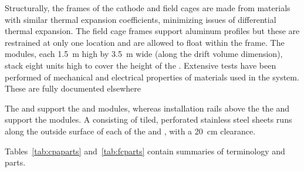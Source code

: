 Structurally, the frames of the cathode and field cages are made from materials with similar thermal expansion coefficients, minimizing issues of differential thermal expansion. The field cage frames support aluminum profiles but these are restrained at only one location and are allowed to float within the frame.
The  modules, each \SI{1.5}{\m} high by \SI{3.5}{\m} wide (along the drift volume dimension), stack eight units high to cover the \tpcheight{} height of the .  
Extensive tests have been performed of mechanical and electrical properties of materials used in the  system.  These are fully documented elsewhere

The  and  support the  and  modules, whereas
installation rails above the the  and  support the  modules. 
A  consisting of tiled, perforated stainless steel sheets %
runs along the outside surface of each of the %
 and , with a \SI{20}{\centi\meter} clearance. 

Tables~\ref{tab:cpaparts} and~\ref{tab:fcparts} contain summaries of terminology and parts.

